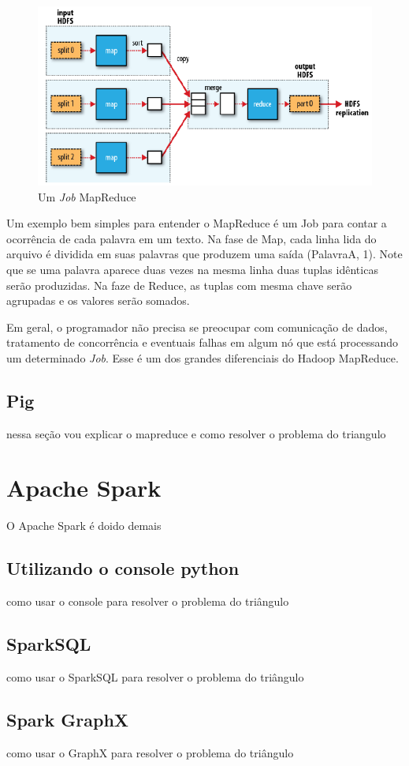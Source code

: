\begin{figure}
	\centering
	\includegraphics[width=\linewidth]{./mapreduce_job.png}
	\caption{Um \textit{Job} MapReduce}
	\label{fig:mapreduce}
\end{figure}

Um exemplo bem simples para entender o MapReduce é um Job para contar a ocorrência de cada palavra em um texto. Na fase de Map, cada linha lida do arquivo é dividida em suas palavras que produzem uma saída (PalavraA, 1). Note que se uma palavra aparece duas vezes na mesma linha duas tuplas idênticas serão produzidas. Na faze de Reduce, as tuplas com mesma chave serão agrupadas e os valores serão somados. 

Em geral, o programador não precisa se preocupar com comunicação de dados, tratamento de concorrência e eventuais falhas em algum nó que está processando um determinado \textit{Job}. Esse é um dos grandes diferenciais do Hadoop MapReduce. 

\subsection{Pig}
nessa seção vou explicar o mapreduce e como resolver o problema do triangulo

\section{Apache Spark}

O Apache Spark é doido demais

\subsection{Utilizando o console python}
como usar o console para resolver o problema do triângulo
\subsection{SparkSQL}
como usar o SparkSQL para resolver o problema do triângulo
\subsection{Spark GraphX}
como usar o GraphX para resolver o problema do triângulo

